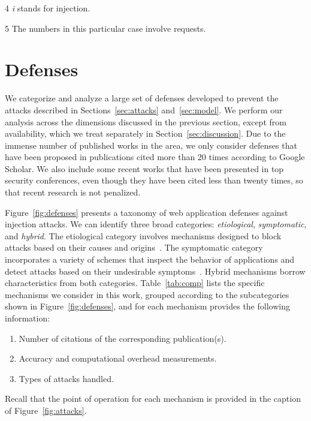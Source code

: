 \documentclass[10pt,journal,compsoc]{IEEEtran}
\begin{document}
\begin{table}[t]
\begin{threeparttable}
\begin{small}
\begin{tablenotes}
\begin{tiny}
    \item[4] {\it i} stands for injection.
    \vspace{-1.8mm}
    \item[5] The numbers in this particular case involve requests.
  \end{tiny}
    \end{tablenotes}
    \end{small}
    \end{threeparttable}
    \vspace{-6.7mm}
\end{table}

\section{Defenses}
\label{sec:defs}

We categorize and analyze a large set of defenses developed to prevent
the attacks described in Sections~\ref{sec:attacks} and~\ref{sec:model}.
We perform our analysis across
the dimensions discussed in the previous section,
except from availability, which we treat
separately in Section~\ref{sec:discussion}.
Due to the immense number of published works in the area, we only consider
defenses that have been proposed in publications cited more than
20 times according to Google Scholar.
We also include some recent works that have been
presented in top security conferences, even though they have been
cited less than twenty times, so that recent research is not penalized.

Figure~\ref{fig:defenses} presents a taxonomy of 
web application defenses against injection attacks.
We can identify three broad categories:
{\it etiological}, {\it symptomatic}, and {\it hybrid}.
The etiological category involves mechanisms designed to
block attacks based on their causes and origins~\cite{L81}. 
The symptomatic category incorporates a variety of schemes that
inspect the behavior of applications and detect attacks based on
their undesirable symptoms~\cite{D76,A00}.
Hybrid mechanisms borrow characteristics from both
categories. Table~\ref{tab:comp} lists the specific mechanisms we consider
in this work, grouped according to the subcategories shown in
Figure~\ref{fig:defenses}, and for each mechanism
provides the following information:

\vspace{-0.5mm}
\begin{enumerate}
\item Number of citations of the corresponding publication(s).
\item Accuracy and computational overhead measurements.
\item Types of attacks handled.
\end{enumerate}
\vspace{-0.5mm}
\noindent
Recall that the point of operation for each mechanism is provided
in the caption of Figure~\ref{fig:attacks}.
\end{document}
